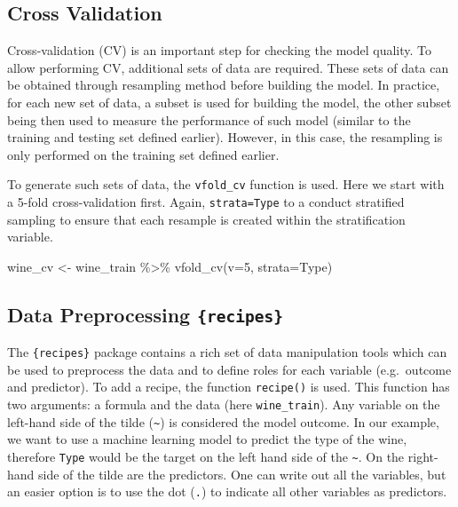 \documentclass[
]{krantz}
\makeatletter
\newenvironment{Shaded}{\begin{snugshade}}{\end{snugshade}}
\newcommand{\AttributeTok}[1]{\textcolor[rgb]{0.61,0.61,0.61}{#1}}
\newcommand{\DecValTok}[1]{\textcolor[rgb]{0.06,0.06,0.06}{#1}}
\newcommand{\FunctionTok}[1]{\textcolor[rgb]{0,0,0}{#1}}
\newcommand{\NormalTok}[1]{#1}
\newcommand{\OtherTok}[1]{\textcolor[rgb]{0.37,0.37,0.37}{#1}}
\newcommand{\SpecialCharTok}[1]{\textcolor[rgb]{0,0,0}{#1}}
\newenvironment{kframe}{%
\medskip{}
\setlength{\fboxsep}{.8em}
 \def\at@end@of@kframe{}%
 \ifinner\ifhmode%
  \def\at@end@of@kframe{\end{minipage}}%
  \begin{minipage}{\columnwidth}%
 \fi\fi%
 \def\FrameCommand##1{\hskip\@totalleftmargin \hskip-\fboxsep
 \colorbox{shadecolor}{##1}\hskip-\fboxsep
     \hskip-\linewidth \hskip-\@totalleftmargin \hskip\columnwidth}%
 \MakeFramed {\advance\hsize-\width
   \@totalleftmargin\z@ \linewidth\hsize
   \@setminipage}}%
 {\par\unskip\endMakeFramed%
 \at@end@of@kframe}
\renewenvironment{Shaded}{\begin{kframe}}{\end{kframe}}
\makeatother
\begin{document}
\hypertarget{cross-validation}{%
\subsection{Cross Validation}\label{cross-validation}}

Cross-validation (CV) is an important step for checking the model quality. To allow performing CV, additional sets of data are required. These sets of data can be obtained through resampling method before building the model. In practice, for each new set of data, a subset is used for building the model, the other subset being then used to measure the performance of such model (similar to the training and testing set defined earlier). However, in this case, the resampling is only performed on the training set defined earlier.

To generate such sets of data, the \texttt{vfold\_cv} function is used. Here we start with a 5-fold cross-validation first. Again, \texttt{strata=Type} to a conduct stratified sampling to ensure that each resample is created within the stratification variable.

\begin{Shaded}
\begin{Highlighting}[]
\NormalTok{wine\_cv }\OtherTok{\textless{}{-}}\NormalTok{ wine\_train }\SpecialCharTok{\%\textgreater{}\%} 
  \FunctionTok{vfold\_cv}\NormalTok{(}\AttributeTok{v=}\DecValTok{5}\NormalTok{, }\AttributeTok{strata=}\NormalTok{Type)}
\end{Highlighting}
\end{Shaded}

\hypertarget{data-preprocessing-recipes}{%
\subsection{\texorpdfstring{Data Preprocessing \texttt{\{recipes\}}}{Data Preprocessing \{recipes\}}}\label{data-preprocessing-recipes}}

The \texttt{\{recipes\}} package contains a rich set of data manipulation tools which can be used to preprocess the data and to define roles for each variable (e.g.~outcome and predictor). To add a recipe, the function \texttt{recipe()} is used. This function has two arguments: a formula and the data (here \texttt{wine\_train}). Any variable on the left-hand side of the tilde (\texttt{\textasciitilde{}}) is considered the model outcome. In our example, we want to use a machine learning model to predict the type of the wine, therefore \texttt{Type} would be the target on the left hand side of the \texttt{\textasciitilde{}}. On the right-hand side of the tilde are the predictors. One can write out all the variables, but an easier option is to use the dot (\texttt{.}) to indicate all other variables as predictors.
\end{document}
